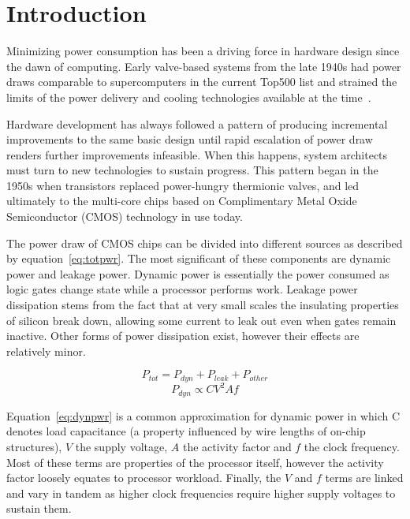 \section{Introduction}

Minimizing power consumption has been a driving force in hardware design since the dawn of computing. Early valve-based systems from the late 1940s had power draws comparable to supercomputers in the current Top500 list and strained the limits of the power delivery and cooling technologies available at the time~\cite{birnbaum:2000aa}.

Hardware development has always followed a pattern of producing incremental improvements to the same basic design until rapid escalation of power draw renders further improvements infeasible. When this happens, system architects must turn to new technologies to sustain progress. This pattern began in the 1950s when transistors replaced power-hungry thermionic valves, and led ultimately to the multi-core chips based on Complimentary Metal Oxide Semiconductor (CMOS) technology in use today.

The power draw of CMOS chips can be divided into different sources as described by equation~\ref{eq:totpwr}. The most significant of these components are dynamic power and leakage power. Dynamic power is essentially the power consumed as logic gates change state while a processor performs work. Leakage power dissipation stems from the fact that at very small scales the insulating properties of silicon break down, allowing some current to leak out even when gates remain inactive. Other forms of power dissipation exist, however their effects are relatively minor. 


\begin{equation}
\label{eq:totpwr}
P_{tot} = P_{dyn} + P_{leak} + P_{other}
\end{equation}
\begin{equation} 
\label{eq:dynpwr}
P_{dyn} \propto CV^{2}Af
\end{equation}

Equation~\ref{eq:dynpwr} is a common approximation for dynamic power in which C denotes load capacitance (a property influenced by wire lengths of on-chip structures), $V$ the supply voltage, $A$ the activity factor and $f$ the clock frequency. Most of these terms are properties of the processor itself, however the activity factor loosely equates to processor workload. Finally, the $V$ and $f$ terms are linked and vary in tandem as higher clock frequencies require higher supply voltages to sustain them. 



